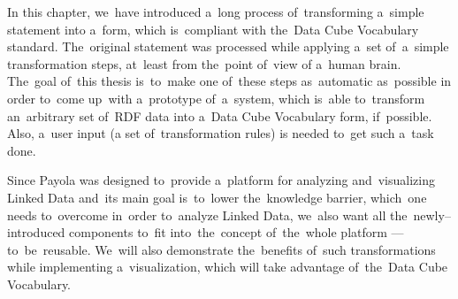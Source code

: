 In this chapter, we~have introduced a~long process of~transforming a~simple statement into
a~form, which is~compliant with the~Data Cube Vocabulary standard. The~original statement
was processed while applying a~set of~a~simple transformation steps, at~least from the~point of~view
of a~human brain. The~goal of~this thesis is~to~make one of~these steps as~automatic as~possible 
in order to~come up~with a~prototype of~a~system, which is~able to~transform an~arbitrary set of~RDF data
into a~Data Cube Vocabulary form, if~possible. Also, a~user input (a set of~transformation rules) is
needed to~get such a~task done. 

\begin{sloppypar}
Since Payola was designed to~provide a~platform for analyzing and~visualizing 
Linked Data and~its main goal is~to~lower the~knowledge barrier, which~one
needs to~overcome in~order to~analyze Linked Data, we~also want all the~newly--introduced 
components to~fit into~the~concept of~the~whole platform --- to~be~reusable.
We~will also demonstrate the~benefits of~such transformations while implementing 
a~visualization, which will take advantage of~the~Data Cube Vocabulary.
\end{sloppypar}
